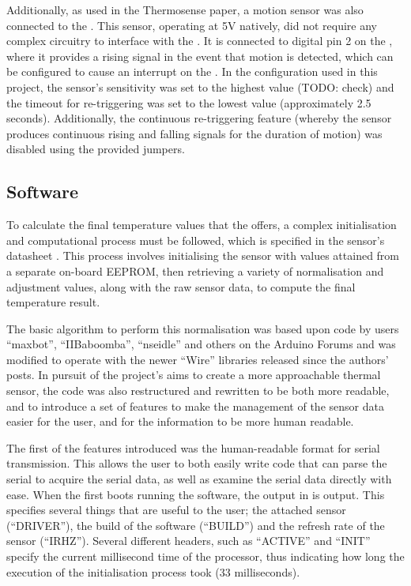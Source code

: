 \documentclass[../thesis/thesis.tex]{subfiles}
\begin{document}
Additionally, as used in the Thermosense paper, a \pir motion sensor \cite{AdafruitPIR} was also connected to the \ard. This sensor, operating at 5V natively, did not require any complex circuitry to interface with the \ard. It is connected to digital pin 2 on the \ard, where it provides a rising signal in the event that motion is detected, which can be configured to cause an interrupt on the \ard. In the configuration used in this project, the sensor's sensitivity was set to the highest value (TODO: check) and the timeout for re-triggering was set to the lowest value (approximately 2.5 seconds). Additionally, the continuous re-triggering feature (whereby the sensor produces continuous rising and falling signals for the duration of motion) was disabled using the provided jumpers. 

\subsection{Software}

To calculate the final temperature values that the \mlx offers, a complex initialisation and computational process must be followed, which is specified in the sensor's datasheet \cite{MLXDatasheet}. This process involves initialising the sensor with values attained from a separate on-board \iic EEPROM, then retrieving a variety of normalisation and adjustment values, along with the raw sensor data, to compute the final temperature result.

The basic algorithm to perform this normalisation was based upon code by users ``maxbot'', ``IIBaboomba'', ``nseidle'' and others on the Arduino Forums \cite{ArduinoForum} and was modified to operate with the newer \ard ``Wire'' \iic libraries released since the authors' posts. In pursuit of the project's aims to create a more approachable thermal sensor, the code was also restructured and rewritten to be both more readable, and to introduce a set of features to make the management of the sensor data easier for the user, and for the information to be more human readable.

The first of the features introduced was the human-readable format for serial transmission. This allows the user to both easily write code that can parse the serial to acquire the serial data, as well as examine the serial data directly with ease. When the \ard first boots running the software, the output in  is output. This specifies several things that are useful to the user; the attached sensor (``DRIVER''), the build of the software (``BUILD'') and the refresh rate of the sensor (``IRHZ''). Several different headers, such as ``ACTIVE'' and ``INIT'' specify the current millisecond time of the processor, thus indicating how long the execution of the initialisation process took (33 milliseconds).
\end{document}
